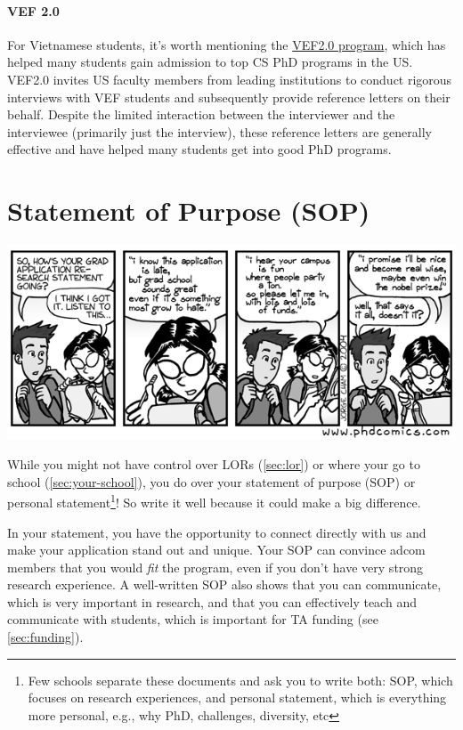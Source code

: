 \documentclass[oneside,11pt,dvipsnames]{book}
\begin{document}
\paragraph{VEF 2.0} For Vietnamese students, it's worth mentioning the \href{https://vef2.org/}{VEF2.0 program}, which has helped many students gain admission to top CS PhD programs in the US. VEF2.0 invites US faculty members from leading institutions to conduct rigorous interviews with VEF students and subsequently provide reference letters on their behalf. Despite the limited interaction between the interviewer and the interviewee (primarily just the interview), these reference letters are generally effective and have helped many students get into good PhD programs.

\section{Statement of Purpose (SOP)}\label{sec:research-statement}

\begin{center}
  \includegraphics[scale=0.4]{files/c2.png}
\end{center}

While you might not have control over LORs (\autoref{sec:lor}) or where your go to school (\autoref{sec:your-school}), you do over your
statement of purpose (SOP) or personal statement\footnote{Few schools separate these documents and ask you to write both: SOP, which focuses on research experiences, and personal statement, which is everything more personal, e.g., why PhD, challenges, diversity, etc}! So write it well because it could make a big difference.

In your statement, you have the opportunity to connect directly with us and make your application stand out and unique. Your SOP can convince adcom members that you would \emph{fit} the program, even if you don't have very strong research experience.
A well-written SOP also shows that you can communicate, which is very important in research, and that you can effectively teach and communicate with students, which is important for TA funding (see \autoref{sec:funding}).
\end{document}
